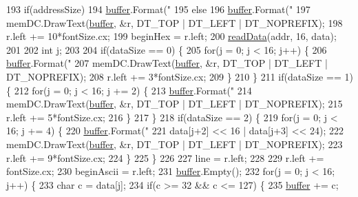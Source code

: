 \begin{DoxyCode}
193     \textcolor{keywordflow}{if}(addressSize)
194       \mbox{\hyperlink{_g_b_a_8cpp_a28d4d3d8445e73a696b2d6f7eadabd96}{buffer}}.Format(\textcolor{stringliteral}{"%
195     \textcolor{keywordflow}{else}
196       \mbox{\hyperlink{_g_b_a_8cpp_a28d4d3d8445e73a696b2d6f7eadabd96}{buffer}}.Format(\textcolor{stringliteral}{"%
197     memDC.DrawText(\mbox{\hyperlink{_g_b_a_8cpp_a28d4d3d8445e73a696b2d6f7eadabd96}{buffer}}, &r, DT\_TOP | DT\_LEFT | DT\_NOPREFIX);
198     r.left += 10*fontSize.cx;
199     beginHex = r.left;
200     \mbox{\hyperlink{class_memory_viewer_a2e1b969cce8f4d60912f6b640febc54a}{readData}}(addr, 16, data);
201     
202     \textcolor{keywordtype}{int} j;
203     
204     \textcolor{keywordflow}{if}(dataSize == 0) \{
205       \textcolor{keywordflow}{for}(j = 0; j < 16; j++) \{
206         \mbox{\hyperlink{_g_b_a_8cpp_a28d4d3d8445e73a696b2d6f7eadabd96}{buffer}}.Format(\textcolor{stringliteral}{"%
207         memDC.DrawText(\mbox{\hyperlink{_g_b_a_8cpp_a28d4d3d8445e73a696b2d6f7eadabd96}{buffer}}, &r, DT\_TOP | DT\_LEFT | DT\_NOPREFIX);
208         r.left += 3*fontSize.cx;
209       \}
210     \}
211     \textcolor{keywordflow}{if}(dataSize == 1) \{
212       \textcolor{keywordflow}{for}(j = 0; j < 16; j += 2) \{
213         \mbox{\hyperlink{_g_b_a_8cpp_a28d4d3d8445e73a696b2d6f7eadabd96}{buffer}}.Format(\textcolor{stringliteral}{"%
214         memDC.DrawText(\mbox{\hyperlink{_g_b_a_8cpp_a28d4d3d8445e73a696b2d6f7eadabd96}{buffer}}, &r, DT\_TOP | DT\_LEFT | DT\_NOPREFIX);
215         r.left += 5*fontSize.cx;
216       \}      
217     \}
218     \textcolor{keywordflow}{if}(dataSize == 2) \{
219       \textcolor{keywordflow}{for}(j = 0; j < 16; j += 4) \{
220         \mbox{\hyperlink{_g_b_a_8cpp_a28d4d3d8445e73a696b2d6f7eadabd96}{buffer}}.Format(\textcolor{stringliteral}{"%
221                       data[j+2] << 16 | data[j+3] << 24);
222         memDC.DrawText(\mbox{\hyperlink{_g_b_a_8cpp_a28d4d3d8445e73a696b2d6f7eadabd96}{buffer}}, &r, DT\_TOP | DT\_LEFT | DT\_NOPREFIX);
223         r.left += 9*fontSize.cx;
224       \}            
225     \}
226     
227     line = r.left;
228     
229     r.left += fontSize.cx;
230     beginAscii = r.left;
231     \mbox{\hyperlink{_g_b_a_8cpp_a28d4d3d8445e73a696b2d6f7eadabd96}{buffer}}.Empty();
232     \textcolor{keywordflow}{for}(j = 0; j < 16; j++) \{
233       \textcolor{keywordtype}{char} c = data[j];
234       \textcolor{keywordflow}{if}(c >= 32 && c <= 127) \{
235         \mbox{\hyperlink{_g_b_a_8cpp_a28d4d3d8445e73a696b2d6f7eadabd96}{buffer}} += c;
}}}}}
\end{DoxyCode}
